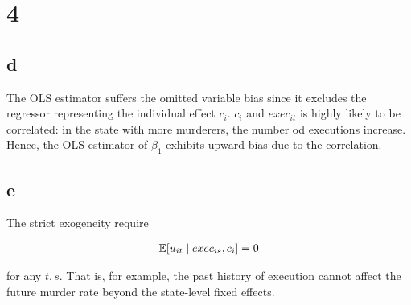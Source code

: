\documentclass[11pt]{article}
\begin{document}
\section*{4}

\subsection*{d}

The OLS estimator suffers the omitted variable bias since it excludes the regressor representing the individual effect $c_i$. $c_i$ and $exec_{it}$ is highly likely to be correlated: in the state with more murderers, the number od executions increase. Hence, the OLS estimator of $\beta_1$ exhibits upward bias due to the correlation.

\subsection*{e}

The strict exogeneity require

\begin{align*}
    \mathbb{E}[u_{it} \mid exec_{is}, c_i] = 0
\end{align*}

for any $t, s$. That is, for example, the past history of execution cannot affect the future murder rate beyond the state-level fixed effects.
\end{document}
